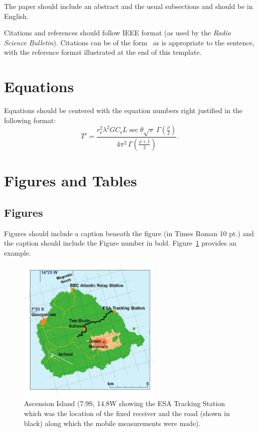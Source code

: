 \documentclass[summary]{ursi}
\begin{document}
The paper should include an abstract and the usual subsections and should
be in English.

Citations and references should follow IEEE format (as used by the
\emph{Radio Science Bulletin}).  Citations can be of the
form~\cite{cannon,mannix} as is appropriate to the sentence, with the
reference format illustrated at the end of this template.

\section{Equations}

Equations should be centered with the equation numbers right justified in
the following format:
\begin{equation}
  \label{eq:T}
  T' = \frac{r_\text{e}^2\lambda^2GC_\text{s}L
    \sec\theta\sqrt{\pi}\ \Gamma\!\left(\frac\rho2\right)}
  {4\pi^2\,\Gamma\!\left(\frac{\rho+1}{2}\right)}.
\end{equation}

\section{Figures and Tables}
\subsection{Figures}

Figures should include a caption beneath the figure (in Times Roman 10 pt.)
and the caption should include the Figure number in
bold. Figure~\ref{fig:asc} provides an example.

\begin{figure}[htbp]
  \centering
  \includegraphics[width=69mm]{ascension_island}
  \caption{Ascension Island (7.9\textdegree S, 14.8\textdegree W showing
    the ESA Tracking Station which was the location of the fixed receiver
    and the road (shown in black) along which the mobile measurements were
    made).}
  \label{fig:asc}
\end{figure}
\end{document}
